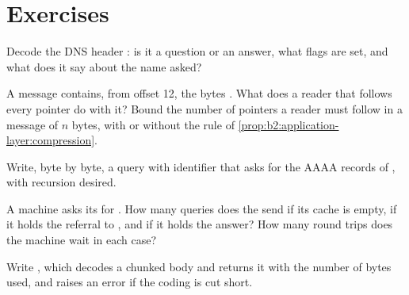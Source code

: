 
\section{Exercises}\label{sec:b2:application-layer:exercises}

\begin{exercise}[$\star$]\label{exo:b2:application-layer:1}
Decode the DNS header : is it a question or an answer, what flags are set,
and what does it say about the name asked?
\end{exercise}

\begin{exercise}[$\star$]\label{exo:b2:application-layer:2}
A message contains, from offset 12, the bytes . What does a reader that follows every pointer
do with it? Bound the number of pointers a reader must follow in a message of $n$ bytes, with or without the rule of
\cref{prop:b2:application-layer:compression}.
\end{exercise}

\begin{exercise}[$\star$]\label{exo:b2:application-layer:3}
Write, byte by byte, a query with identifier  that asks for the AAAA records of ,
with recursion desired.
\end{exercise}

\begin{exercise}[$\star$]\label{exo:b2:application-layer:4}
A machine asks its  for . How many queries does the  send if its cache is
empty, if it holds the referral to , and if it holds the answer? How many round trips does the
machine wait in each case?
\end{exercise}

\begin{exercise}[$\star\star$]\label{exo:b2:application-layer:5}
Write , which decodes a chunked body and returns it with the number of bytes used, and raises an
error if the coding is cut short.
\end{exercise}

